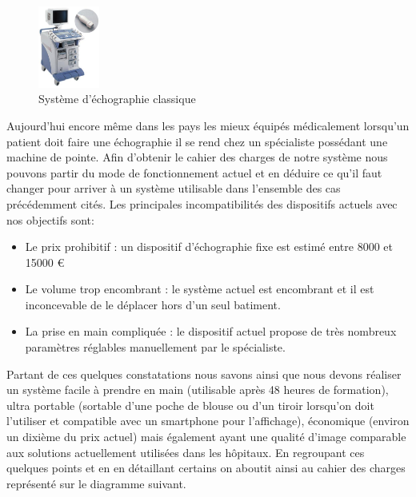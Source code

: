 \documentclass[12pt]{article}
\begin{document}
\newpage
\vspace{15pt}
\begin{figure}
  \vspace{-0pt}
  \begin{center}
    \includegraphics[width=0.18\textwidth]{Images_Rapport/echo}
  \end{center}
  \vspace{-5pt}
  \caption{Système d'échographie classique}
  \vspace{-10pt}
\end{figure}


\vspace{20pt}
Aujourd'hui encore même dans les pays les mieux équipés médicalement lorsqu'un patient doit faire une échographie il se rend chez un spécialiste possédant une machine de pointe. Afin d'obtenir le cahier des charges de notre système nous pouvons partir du mode de fonctionnement actuel et en déduire ce qu'il faut changer pour arriver à un système utilisable dans l'ensemble des cas précédemment cités. Les principales incompatibilités des dispositifs actuels avec nos objectifs sont: \par
\vspace{10pt}




\begin{itemize}
\item Le prix prohibitif : un dispositif d'échographie fixe est estimé entre 8000 et 15000 \euro{}
\item Le volume trop encombrant : le système actuel est encombrant et il est inconcevable de le déplacer hors d'un seul batiment.
\item La prise en main compliquée : le dispositif actuel propose de très nombreux paramètres réglables manuellement par le spécialiste.
\end{itemize}










\vspace{10pt}
\newpage
Partant de ces quelques constatations nous savons ainsi que nous devons réaliser un système facile à prendre en main (utilisable après 48 heures de formation), ultra portable (sortable d'une poche de blouse ou d'un tiroir lorsqu'on doit l'utiliser et compatible avec un smartphone pour l'affichage), économique (environ un dixième du prix actuel) mais également ayant une qualité d'image comparable aux solutions actuellement utilisées dans les hôpitaux. En regroupant ces quelques points et en en détaillant certains on aboutit ainsi au cahier des charges représenté sur le diagramme suivant.  \par
\vspace{15pt}
\end{document}
